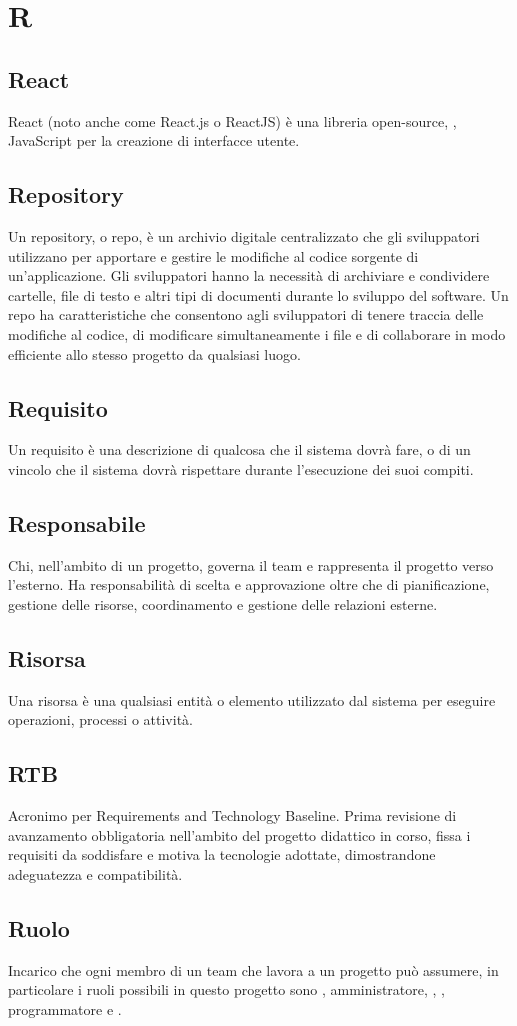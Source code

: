 \chapter{R}

\section{React}
React (noto anche come React.js o ReactJS) è una libreria open-source, , JavaScript per la creazione di interfacce utente.

\section{Repository}\label{sec:Repo}
Un repository, o repo, è un archivio digitale centralizzato che gli sviluppatori utilizzano per apportare e gestire le modifiche al codice sorgente di un'applicazione. Gli sviluppatori hanno la necessità di archiviare e condividere cartelle, file di testo e altri tipi di documenti durante lo sviluppo del software. Un repo ha caratteristiche che consentono agli sviluppatori di tenere traccia delle modifiche al codice, di modificare simultaneamente i file e di collaborare in modo efficiente allo stesso progetto da qualsiasi luogo. 

\section{Requisito}\label{sec:Requisiti}
Un requisito è una descrizione di qualcosa che il sistema dovrà fare, o di un vincolo che il sistema dovrà rispettare durante l’esecuzione dei suoi compiti.

\section{Responsabile}
Chi, nell'ambito di un progetto, governa il team e rappresenta il progetto verso l'esterno. Ha responsabilità di scelta e approvazione oltre che di pianificazione, gestione delle risorse, coordinamento e gestione delle relazioni esterne. 

\section{Risorsa}\label{sec:Risorse}
Una risorsa è una qualsiasi entità o elemento utilizzato dal sistema per eseguire operazioni, processi o attività.

\section{RTB}\label{sec:Requirements and Technology Baseline}
Acronimo per Requirements and Technology Baseline. Prima revisione di avanzamento obbligatoria nell'ambito del progetto didattico in corso, fissa i requisiti da soddisfare e motiva la tecnologie adottate, dimostrandone adeguatezza e compatibilità.
\section{Ruolo}\label{sec:Ruoli}
Incarico che ogni membro di un team che lavora a un progetto può assumere, in particolare i ruoli possibili in questo progetto sono , amministratore, , , programmatore e .
